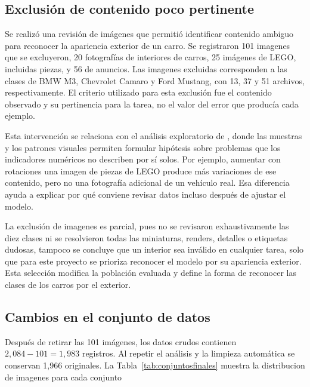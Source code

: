 \documentclass[conference]{IEEEtran}
\begin{document}
\subsection{Exclusión de contenido poco pertinente}

Se realizó una revisión de imágenes que permitió identificar contenido ambiguo para reconocer la apariencia exterior de un carro. Se registraron 101 imagenes que se excluyeron, 20 fotografías de interiores de carros, 25 imágenes de LEGO, incluidas piezas, y 56 de anuncios. Las imagenes excluidas corresponden a las clases de BMW M3, Chevrolet Camaro y Ford Mustang, con 13, 37 y 51 archivos, respectivamente. El criterio utilizado para esta exclusión fue el contenido observado y su pertinencia para la tarea, no el valor del error que producía cada ejemplo. 

Esta intervención se relaciona con el análisis exploratorio de \citet{zhang2024}, donde las muestras y los patrones visuales permiten formular hipótesis sobre problemas que los indicadores numéricos no describen por sí solos. Por ejemplo, aumentar con rotaciones una imagen de piezas de LEGO produce más variaciones de ese contenido, pero no una fotografía adicional de un vehículo real. Esa diferencia ayuda a explicar por qué conviene revisar datos incluso después de ajustar el modelo.

La exclusión de imagenes es parcial, pues no se revisaron exhaustivamente las diez clases ni se resolvieron todas las miniaturas, renders, detalles o etiquetas dudosas, tampoco se concluye que un interior sea inválido en cualquier tarea, solo que para este proyecto se prioriza reconocer el modelo por su apariencia exterior. Esta selección modifica la población evaluada y define la forma de reconocer las clases de los carros por el exterior.

\subsection{Cambios en el conjunto de datos}

Después de retirar las 101 imágenes, los datos crudos contienen $2{,}084-101=1{,}983$ registros. Al repetir el análisis y la limpieza automática se conservan 1,966 originales. La Tabla~\ref{tab:conjuntosfinales} muestra la distribucion de imagenes para cada conjunto
\end{document}
